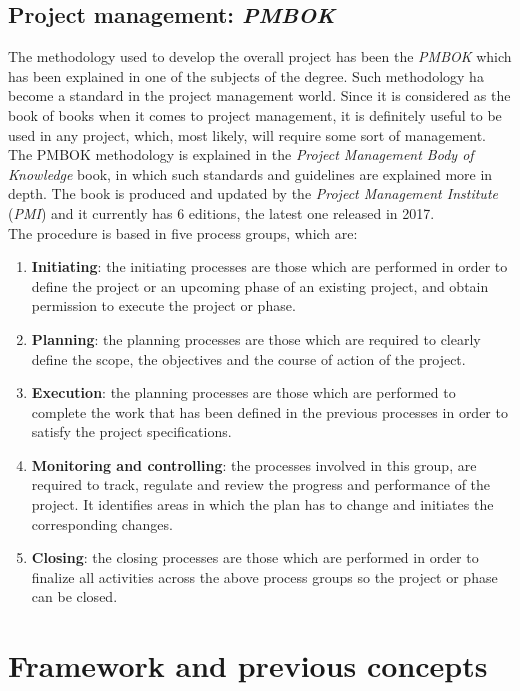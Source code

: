 \documentclass[a4paper, 12pt, oneside]{book}
\begin{document}
\section{Project management: \emph{PMBOK}}
The methodology used to develop the overall project has been the \emph{PMBOK} which has been explained in one of the subjects of the degree. Such methodology ha become a standard in the project management world. Since it is considered as the book of books when it comes to project management, it is definitely useful to be used in any project, which, most likely, will require some sort of management.
\\[8pt]
The PMBOK methodology is explained in the \emph{Project Management Body of Knowledge} book, in which such standards and guidelines are explained more in depth. The book is produced and updated by the \emph{Project Management Institute} (\emph{PMI}) and it currently has 6 editions, the latest one released in 2017.
\\[8pt]
The procedure is based in five process groups, which are:
\begin{enumerate}[label = \arabic{*}.]
	\item \textbf{Initiating}: the initiating processes are those which are performed in order to define the project or an upcoming phase of an existing project, and obtain permission to execute the project or phase.
	\item \textbf{Planning}: the planning processes are those which are required to clearly define the scope, the objectives and the course of action of the project.
	\item \textbf{Execution}: the planning processes are those which are performed to complete the work that has been defined in the previous processes in order to satisfy the project specifications.
	\item \textbf{Monitoring and controlling}: the processes involved in this group, are required to track, regulate and review the progress and performance of the project. It identifies areas in which the plan has to change and initiates the corresponding changes.
	\item \textbf{Closing}: the closing processes are those which are performed in order to finalize all activities across the above process groups so the project or phase can be closed.
\end{enumerate}
\chapter{Framework and previous concepts}
\end{document}
